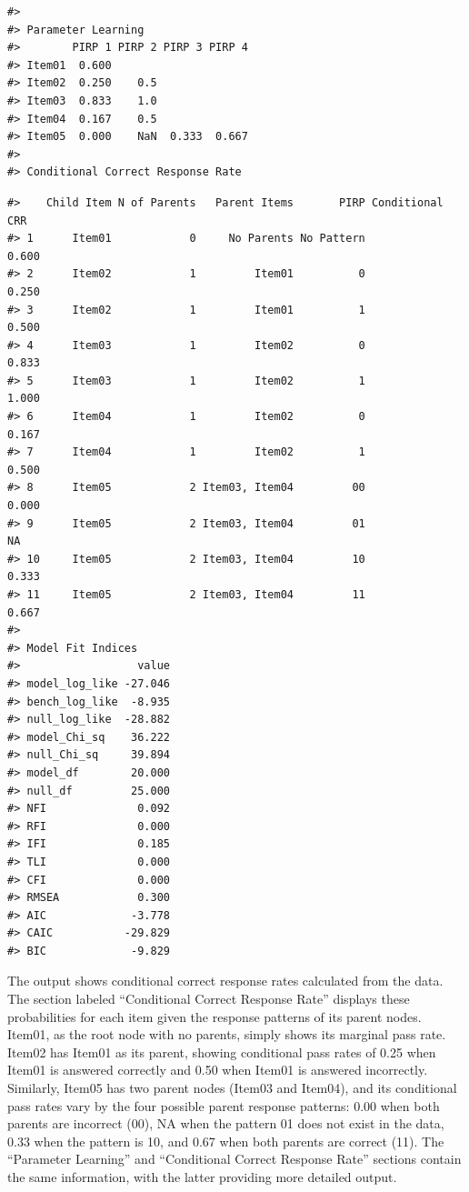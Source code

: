 \begin{verbatim}
#> 
#> Parameter Learning
#>        PIRP 1 PIRP 2 PIRP 3 PIRP 4
#> Item01  0.600                     
#> Item02  0.250    0.5              
#> Item03  0.833    1.0              
#> Item04  0.167    0.5              
#> Item05  0.000    NaN  0.333  0.667
#> 
#> Conditional Correct Response Rate
\end{verbatim}

\begin{verbatim}
#>    Child Item N of Parents   Parent Items       PIRP Conditional CRR
#> 1      Item01            0     No Parents No Pattern           0.600
#> 2      Item02            1         Item01          0           0.250
#> 3      Item02            1         Item01          1           0.500
#> 4      Item03            1         Item02          0           0.833
#> 5      Item03            1         Item02          1           1.000
#> 6      Item04            1         Item02          0           0.167
#> 7      Item04            1         Item02          1           0.500
#> 8      Item05            2 Item03, Item04         00           0.000
#> 9      Item05            2 Item03, Item04         01              NA
#> 10     Item05            2 Item03, Item04         10           0.333
#> 11     Item05            2 Item03, Item04         11           0.667
#> 
#> Model Fit Indices
#>                  value
#> model_log_like -27.046
#> bench_log_like  -8.935
#> null_log_like  -28.882
#> model_Chi_sq    36.222
#> null_Chi_sq     39.894
#> model_df        20.000
#> null_df         25.000
#> NFI              0.092
#> RFI              0.000
#> IFI              0.185
#> TLI              0.000
#> CFI              0.000
#> RMSEA            0.300
#> AIC             -3.778
#> CAIC           -29.829
#> BIC             -9.829
\end{verbatim}

The output shows conditional correct response rates calculated from the data. The section labeled ``Conditional Correct Response Rate'' displays these probabilities for each item given the response patterns of its parent nodes. Item01, as the root node with no parents, simply shows its marginal pass rate. Item02 has Item01 as its parent, showing conditional pass rates of 0.25 when Item01 is answered correctly and 0.50 when Item01 is answered incorrectly. Similarly, Item05 has two parent nodes (Item03 and Item04), and its conditional pass rates vary by the four possible parent response patterns: 0.00 when both parents are incorrect (00), NA when the pattern 01 does not exist in the data, 0.33 when the pattern is 10, and 0.67 when both parents are correct (11). The ``Parameter Learning'' and ``Conditional Correct Response Rate'' sections contain the same information, with the latter providing more detailed output.

